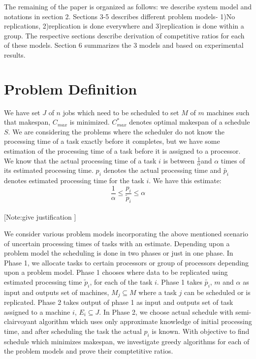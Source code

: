 \documentclass[10pt, conference, compsocconf]{IEEEtran}
\begin{document}
 The remaining of the paper is organized as follows: we describe system model and notations in section 2. Sections 3-5 describes different problem models- 1)No replications, 2)replication is done everywhere and 3)replication is done within a group. The respective sections describe derivation of competitive ratios for each of these models. Section 6 summarizes the 3 models and based on experimental results.  

\section{Problem Definition}
We have set $J$ of $n$ jobs which need to be scheduled to set $M$ of $m$ machines such that makespan, $C_{max}$ is minimized.   $C_{max}^{*}$ denotes optimal makespan of a schedule $S$.   We are considering the problems where the scheduler do not know the processing time of a task exactly before it completes, but we have some estimation of the processing time of a task before it is  assigned to a processor. We know that the actual processing time of a task $i$ is between $\frac{1}{\alpha}$and $\alpha$ times of its estimated processing time. $p_i$ denotes the actual processing time and $\tilde {p_i}$ denotes
estimated processing time for the task $i$.  We have this estimate:\\
\begin{equation} 
\frac{1}{\alpha}\leq \frac{p_{i}}{\tilde{p}_{i}}\leq \alpha
\end{equation}\\

[Note:give justification ]


We consider various problem models  incorporating the above mentioned scenario of uncertain processing times of tasks with an estimate. Depending upon  a problem model the scheduling is done in two phases or just in one phase. In Phase 1, we allocate tasks to certain processors or group of processors depending upon a problem model.  Phase 1 chooses where data to be  replicated using estimated processing time $\tilde p_i $, for each of the task $i$. Phase 1 takes $\tilde{p_i}$, $m$ and $\alpha$ as input and outputs set of machines, $M_j \subseteq M $ where a task $j$ can be scheduled or is replicated. Phase 2 takes output of phase 1 as input and outputs set of task assigned to a machine $i$, $E_i \subseteq J$.   In Phase 2, we choose actual schedule with semi-clairvoyant algorithm which uses only approximate knowledge of initial processing time, and after scheduling the task the actual $p_i$ is known.  With  objective to find schedule which minimizes makespan, we investigate greedy algorithms for each of the problem models and prove their comptetitive ratios. 
\end{document}
